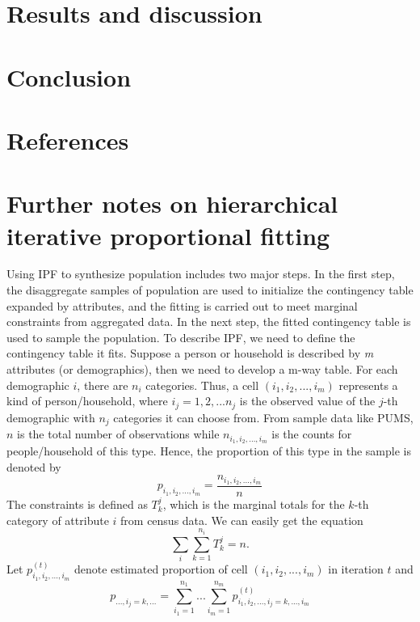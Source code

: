 \documentclass[11pt,twoside]{article}
\numberwithin{equation}{section}
\newcommand{\?}{\stackrel{?}{=}}
\begin{document}
\section{Results and discussion}



\section{Conclusion}
\section{References}
\printbibliography

\appendix
\section{Further notes on hierarchical iterative proportional fitting}
Using IPF to synthesize population includes two major steps.
In the first step, the disaggregate samples of population are used to initialize the contingency table expanded by attributes, and the fitting is carried out to meet marginal constraints from aggregated data.
In the next step, the fitted contingency table is used to sample the population.
To describe IPF, we need to define the contingency table it fits.
Suppose a person or household is described by \textit{m} attributes (or demographics), then we need to develop a m-way table.
For each demographic $i$, there are $n_i$ categories.
Thus, a cell $(i_1, i_2,..., i_m)$ represents a kind of person/household, where $i_j = 1,2,...n_j$ is the observed value of the $j$-th demographic with $n_j$ categories it can choose from.
From sample data like PUMS, $n$ is the total number of observations while $n_{i_1, i_2,...,i_m}$ is the counts for people/household of this type.
Hence, the proportion of this type in the sample is denoted by
\begin{equation}
  \label{eqn:prop}
   p_{i_1,i_2,...,i_m} = \frac{n_{i_1, i_2,...,i_m}}{n}
\end{equation}
The constraints is defined as $T_k^j$, which is the marginal totals for the $k$-th category of attribute $i$ from census data.
We can easily get the equation
\begin{equation}
  \label{eq:2}
\sum_i\sum_{k=1}^{n_i}T_k^j=n.  
\end{equation}
Let $p_{i_1,i_2,...,i_m}^{(t)}$ denote estimated proportion of cell $(i_1, i_2,..., i_m)$ in iteration $t$ and
\begin{equation}
  \label{eq:3}
  p_{...,i_j=k,...} = \sum_{i_1=1}^{n_1}...\sum_{i_m=1}^{n_m}p_{i_1,i_2,...,i_j=k,...,i_m}^{(t)}  
\end{equation}
\end{document}
